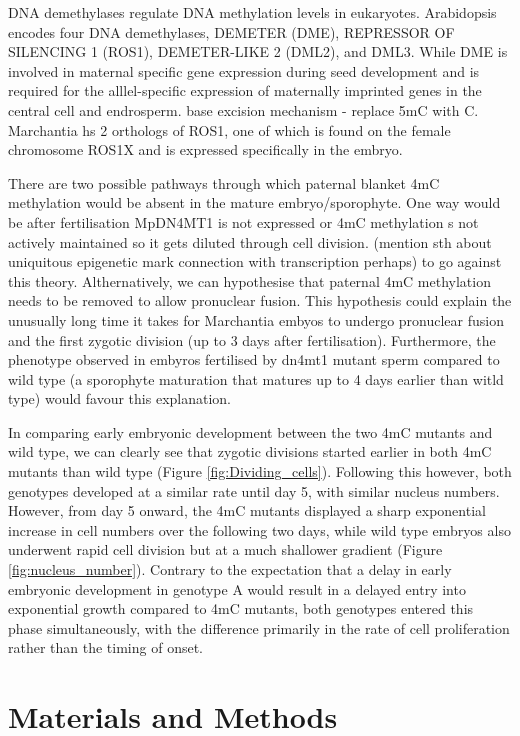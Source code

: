 DNA demethylases regulate DNA methylation levels in eukaryotes. Arabidopsis encodes four DNA demethylases, DEMETER (DME), REPRESSOR OF SILENCING 1 (ROS1), DEMETER-LIKE 2 (DML2), and DML3. While DME is involved in maternal specific gene expression during seed development and is required for the alllel-specific expression of maternally imprinted genes in the central cell and endrosperm. base excision mechanism - replace 5mC with C. Marchantia hs 2 orthologs of ROS1, one of which is found on the female chromosome ROS1X and is expressed specifically in the embryo. 

There are two possible pathways through which paternal blanket 4mC methylation would be absent in the mature embryo/sporophyte. One way would be after fertilisation MpDN4MT1 is not expressed or 4mC methylation s not actively maintained so it gets diluted through cell division. (mention sth about uniquitous epigenetic mark connection with transcription perhaps) to go against this theory. Althernatively, we can hypothesise that paternal 4mC methylation needs to be removed to allow pronuclear fusion. This hypothesis could explain the unusually long time it takes for Marchantia embyos to undergo pronuclear fusion and the first zygotic division (up to 3 days after fertilisation). Furthermore, the phenotype observed in embyros fertilised by dn4mt1 mutant sperm compared to wild type (a sporophyte maturation that matures up to 4 days earlier than witld type) would favour this explanation.

In comparing early embryonic development between the two 4mC mutants and wild type, we can clearly see that zygotic divisions started earlier in both 4mC mutants than wild type (Figure \ref{fig:Dividing_cells}). Following this however, both genotypes developed at a similar rate until day 5, with similar nucleus numbers. However, from day 5 onward, the 4mC mutants displayed a sharp exponential increase in cell numbers over the following two days, while wild type embryos also underwent rapid cell division but at a much shallower gradient (Figure \ref{fig:nucleus_number}). Contrary to the expectation that a delay in early embryonic development in genotype A would result in a delayed entry into exponential growth compared to 4mC mutants, both genotypes entered this phase simultaneously, with the difference primarily in the rate of cell proliferation rather than the timing of onset.

\clearpage

\section{Materials and Methods}

